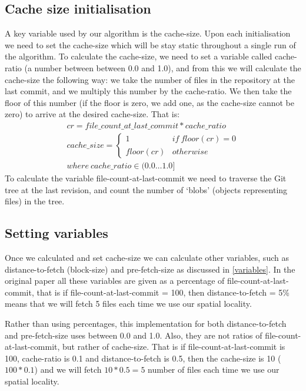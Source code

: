 \documentclass[12pt,twoside,notitlepage]{report}
\begin{document}
\subsection{Cache size initialisation} A key variable used by our algorithm is the cache-size. Upon each initialisation we need to set the cache-size which will be stay static throughout a single run of the algorithm. To calculate the cache-size, we need to set a variable called cache-ratio (a number between between 0.0 and 1.0), and from this we will calculate the cache-size the following way: we take the number of files in the repository at the last commit, and we multiply this number by the cache-ratio. We then take the floor of this number (if the floor is zero, we add one, as the cache-size cannot be zero) to arrive at the desired cache-size. That is:
\begin{align*}
	cr = file\_count\_at\_last\_commit*cache\_ratio\\
	cache\_size = \begin{cases}
						1 & if\ floor(cr) = 0\\
						floor(cr) & otherwise
					\end{cases}\\
	where\ cache\_ratio \in (0.0\dots 1.0]
\end{align*}
To calculate the variable file-count-at-last-commit we need to traverse the Git tree at the last revision, and count the number of `blobs' (objects representing files) in the tree. 

\subsection{Setting variables} Once we calculated and set cache-size we can calculate other variables, such as distance-to-fetch (block-size) and pre-fetch-size as discussed in \ref{variables}. In the original paper all these variables are given as a percentage of file-count-at-last-commit, that is if file-count-at-last-commit = 100, then distance-to-fetch = 5\% means that we will fetch 5 files each time we use our spatial locality.

Rather than using percentages, this implementation for both distance-to-fetch and pre-fetch-size uses between 0.0 and 1.0. Also, they are not ratios of file-count-at-last-commit, but rather of cache-size. That is if file-count-at-last-commit is 100, cache-ratio is 0.1 and distance-to-fetch is 0.5, then the cache-size is 10 ($100*0.1$) and we will fetch $10*0.5 = 5$ number of files each time we use our spatial locality.
\end{document}

